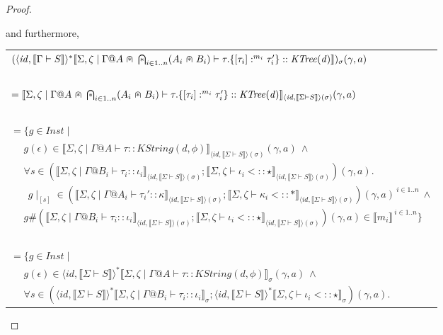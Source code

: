 \documentclass{article}
\newcommand{\sem}[1]{\llbracket #1 \rrbracket}
\newcommand{\capdot}{~\stackinset{c}{}{c}{}{\scalebox{0.8}{$\ast$}}{$\cap$}~}
\newcommand{\bigcapdot}{\mathop{\stackinset{c}{}{c}{}{\scalebox{0.8}{$\ast$}}{$\bigcap$}}}
\begin{document}
\begin{proof}
\begin{description}
and furthermore,
\begin{center}
\begin{tabular}{l}
$(\langle \mathit{id}, \sem{\Gamma \vdash S} \rangle^* \sem{\Sigma,\zeta \mid \Gamma @ A \capdot \bigcapdot_{i \in 1..n} (A_i \capdot B_i) \vdash \tau.\{ [\tau_i] :^{m_i} \tau_i' \} :: \mathit{KTree(d)} })_\sigma (\gamma,a)$ \\~\\
$= \sem{\Sigma,\zeta \mid \Gamma @ A \capdot \bigcapdot_{i \in 1..n} (A_i \capdot B_i) \vdash \tau.\{ [\tau_i] :^{m_i} \tau_i' \} :: \mathit{KTree(d)} }_{\langle \mathit{id}, \sem{\Sigma \vdash S} \rangle(\sigma)}(\gamma,a)$ \\~\\
$= \{ g \in \mathit{Inst} \mid$ \\
$~~~~~~g(\epsilon) \in \sem{\Sigma,\zeta \mid \Gamma @ A \vdash \tau :: \mathit{KString(d,\phi)}}_{\langle \mathit{id}, \sem{\Sigma \vdash S} \rangle(\sigma)}(\gamma,a)~\wedge$ \\
$~~~~~~\forall s \in (\sem{\Sigma,\zeta \mid \Gamma @ B_i \vdash \tau_i :: \iota_i}_{\langle \mathit{id}, \sem{\Sigma \vdash S} \rangle(\sigma)};\sem{\Sigma,\zeta \vdash \iota_i <:: \star}_{\langle \mathit{id}, \sem{\Sigma \vdash S} \rangle(\sigma)})(\gamma,a).$\\
$~~~~~~~~g \! \mid_{[s]} \in (\sem{\Sigma,\zeta \mid \Gamma @ A_i \vdash \tau_i' :: \kappa}_{\langle \mathit{id}, \sem{\Sigma \vdash S} \rangle(\sigma)};\sem{\Sigma,\zeta \vdash \kappa_i <:: \ast}_{\langle \mathit{id}, \sem{\Sigma \vdash S} \rangle(\sigma)})(\gamma,a)^{~i \in 1..n}~\wedge$\\
$~~~~~~g \# (\sem{\Sigma,\zeta \mid \Gamma @ B_i \vdash \tau_i :: \iota_i}_{\langle \mathit{id}, \sem{\Sigma \vdash S} \rangle(\sigma)};\sem{\Sigma,\zeta \vdash \iota_i <:: \star}_{\langle \mathit{id}, \sem{\Sigma \vdash S} \rangle(\sigma)})(\gamma,a) \in \sem{m_i}^{~i \in 1..n} \}$\\~\\
$= \{ g \in \mathit{Inst} \mid$ \\
$~~~~~~g(\epsilon) \in \langle \mathit{id}, \sem{\Sigma \vdash S} \rangle^* \sem{\Sigma,\zeta \mid \Gamma @ A \vdash \tau :: \mathit{KString(d,\phi)}}_{\sigma}(\gamma,a)~\wedge$ \\
$~~~~~~\forall s \in (\langle \mathit{id}, \sem{\Sigma \vdash S} \rangle^* \sem{\Sigma,\zeta \mid \Gamma @ B_i \vdash \tau_i :: \iota_i}_{\sigma};\langle \mathit{id}, \sem{\Sigma \vdash S} \rangle^* \sem{\Sigma,\zeta \vdash \iota_i <:: \star}_{\sigma})(\gamma,a).$\\

\end{tabular}
\end{center}
\end{description}
\end{proof}
\end{document}
